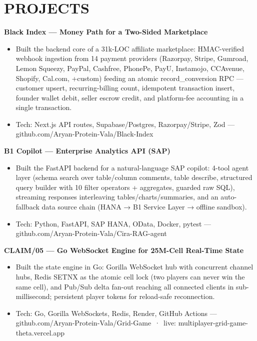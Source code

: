 \documentclass[9pt]{article}
\begin{document}
\section*{PROJECTS}
\textbf{Black Index  ---  Money Path for a Two-Sided Marketplace}
\vspace{1pt}
\begin{itemize}[leftmargin=11pt,itemsep=0pt,topsep=1pt,parsep=0pt]
\item Built the backend core of a 31k-LOC affiliate marketplace: HMAC-verified webhook ingestion from 14 payment providers (Razorpay, Stripe, Gumroad, Lemon Squeezy, PayPal, Cashfree, PhonePe, PayU, Instamojo, CCAvenue, Shopify, Cal.com, +custom) feeding an atomic record\_conversion RPC  ---  customer upsert, recurring-billing count, idempotent transaction insert, founder wallet debit, seller escrow credit, and platform-fee accounting in a single transaction.
\item Tech: Next.js API routes, Supabase/Postgres, Razorpay/Stripe, Zod  ---  github.com/Aryan-Protein-Vala/Black-Index
\end{itemize}
\textbf{B1 Copilot  ---  Enterprise Analytics API (SAP)}
\vspace{1pt}
\begin{itemize}[leftmargin=11pt,itemsep=0pt,topsep=1pt,parsep=0pt]
\item Built the FastAPI backend for a natural-language SAP copilot: 4-tool agent layer (schema search over table/column comments, table describe, structured query builder with 10 filter operators + aggregates, guarded raw SQL), streaming responses interleaving tables/charts/summaries, and an auto-fallback data source chain (HANA → B1 Service Layer → offline sandbox).
\item Tech: Python, FastAPI, SAP HANA, OData, Docker, pytest  ---  github.com/Aryan-Protein-Vala/Cira-RAG-agent
\end{itemize}
\textbf{CLAIM/05  ---  Go WebSocket Engine for 25M-Cell Real-Time State}
\vspace{1pt}
\begin{itemize}[leftmargin=11pt,itemsep=0pt,topsep=1pt,parsep=0pt]
\item Built the state engine in Go: Gorilla WebSocket hub with concurrent channel hubs, Redis SETNX as the atomic cell lock (two players can never win the same cell), and Pub/Sub delta fan-out reaching all connected clients in sub-millisecond; persistent player tokens for reload-safe reconnection.
\item Tech: Go, Gorilla WebSockets, Redis, Render, GitHub Actions  ---  github.com/Aryan-Protein-Vala/Grid-Game \,·\, live: multiplayer-grid-game-theta.vercel.app
\end{itemize}
\end{document}
